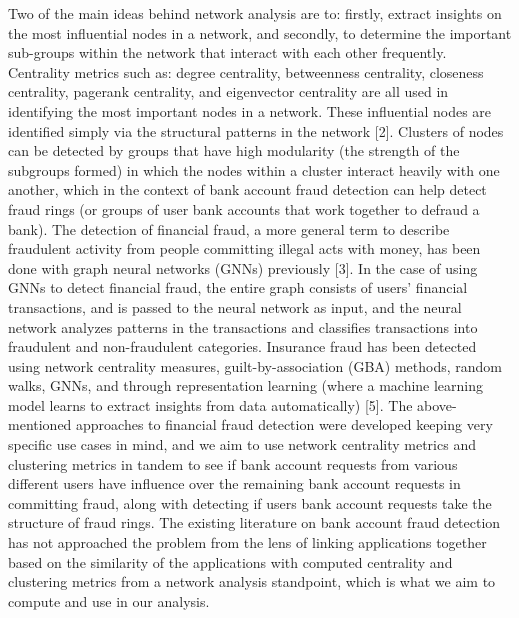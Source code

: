 \documentclass{styles/svproc}
\begin{document}
\bigskip
\noindent Two of the main ideas behind network analysis are to: firstly, extract insights on the most influential nodes in a network, and secondly, to determine the important sub-groups within the network that interact with each other frequently. Centrality metrics such as: degree centrality, betweenness centrality, closeness centrality, pagerank centrality, and eigenvector centrality are all used in identifying the most important nodes in a network. These influential nodes are identified simply via the structural patterns in the network [2]. Clusters of nodes can be detected by groups that have high modularity (the strength of the subgroups formed) in which the nodes within a cluster interact heavily with one another, which in the context of bank account fraud detection can help detect fraud rings (or groups of user bank accounts that work together to defraud a bank). The detection of financial fraud, a more general term to describe fraudulent activity from people committing illegal acts with money, has been done with graph neural networks (GNNs) previously [3]. In the case of using GNNs to detect financial fraud, the entire graph consists of users’ financial transactions, and is passed to the neural network as input, and the neural network analyzes patterns in the transactions and classifies transactions into fraudulent and non-fraudulent categories. Insurance fraud has been detected using network centrality measures, guilt-by-association (GBA) methods, random walks, GNNs, and through representation learning (where a machine learning model learns to extract insights from data automatically) [5]. The above-mentioned approaches to financial fraud detection were developed keeping very specific use cases in mind, and we aim to use network centrality metrics and clustering metrics in tandem to see if bank account requests from various different users have influence over the remaining bank account requests in committing fraud, along with detecting if users bank account requests take the structure of fraud rings. The existing literature on bank account fraud detection has not approached the problem from the lens of linking applications together based on the similarity of the applications with computed centrality and clustering metrics from a network analysis standpoint, which is what we aim to compute and use in our analysis.
\end{document}
